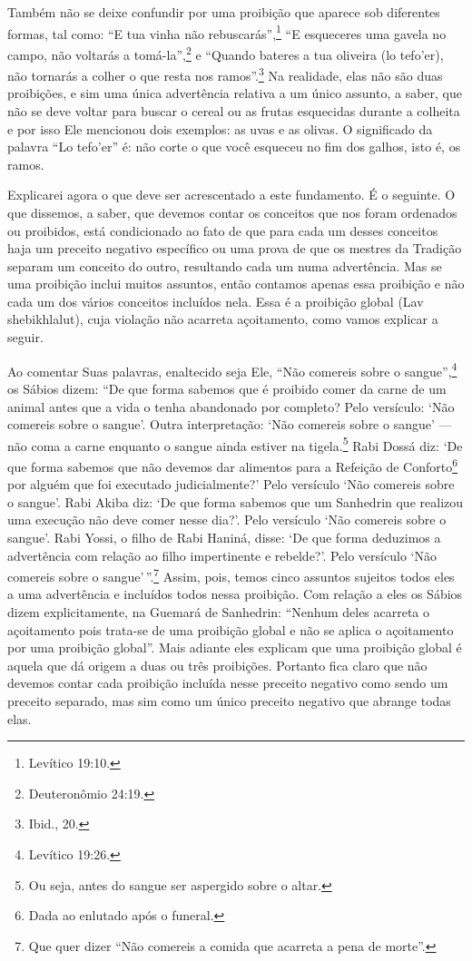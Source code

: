 Também não se deixe confundir por uma proibição que aparece sob
diferentes formas, tal como: ``E tua vinha não rebuscarás'',\footnote{Levítico
19:10.} ``E esqueceres uma gavela no campo, não voltarás a tomá-la'',\footnote{Deuteronômio 24:19.} e ``Quando bateres a tua oliveira (lo tefo'er),
não tornarás a colher o que resta nos ramos''.\footnote{Ibid., 20.} Na realidade,
elas não são duas proibições, e sim uma única advertência relativa a um
único assunto, a saber, que não se deve voltar para buscar o cereal ou
as frutas esquecidas durante a colheita e por isso Ele mencionou dois
exemplos: as uvas e as olivas. O significado da palavra ``Lo tefo'er''
é: não corte o que você esqueceu no fim dos galhos, isto é, os ramos.

Explicarei agora o que deve ser acrescentado a este fundamento. É o
seguinte. O que dissemos, a saber, que devemos contar os conceitos que
nos foram ordenados ou proibidos, está condicionado ao fato de que para
cada um desses conceitos haja um preceito negativo específico ou uma
prova de que os mestres da Tradição separam um conceito do outro,
resultando cada um numa advertência. Mas se uma proibição inclui muitos
assuntos, então contamos apenas essa proibição e não cada um dos vários
conceitos incluídos nela. Essa é a proibição global (Lav shebikhlalut),
cuja violação não acarreta açoitamento, como vamos explicar a seguir.

Ao comentar Suas palavras, enaltecido seja Ele, ``Não comereis sobre o
sangue'',\footnote{Levítico 19:26.} os Sábios dizem: ``De que forma sabemos que é
proibido comer da carne de um animal antes que a vida o tenha abandonado
por completo? Pelo versículo: `Não comereis sobre o sangue'. Outra
interpretação: `Não comereis sobre o sangue' --- não coma a carne
enquanto o sangue ainda estiver na tigela.\footnote{Ou seja, antes do sangue ser aspergido sobre o altar.} Rabi
Dossá diz: `De que forma sabemos que não devemos dar alimentos para a
Refeição de Conforto\footnote{Dada ao enlutado após o funeral.} por alguém que foi executado
judicialmente?' Pelo versículo `Não comereis sobre o sangue'. Rabi Akiba
diz: `De que forma sabemos que um Sanhedrin que realizou uma execução
não deve comer nesse dia?'. Pelo versículo `Não comereis sobre o
sangue'. Rabi Yossi, o filho de Rabi Haniná, disse: `De que forma
deduzimos a advertência com relação ao filho impertinente e rebelde?'.
Pelo versículo `Não comereis sobre o sangue'\,''.\footnote{Que quer dizer ``Não comereis a comida que acarreta a pena de
  morte''.}
Assim, pois, temos cinco assuntos sujeitos todos eles a uma advertência
e incluídos todos nessa proibição. Com relação a eles os Sábios dizem
explicitamente, na Guemará de Sanhedrin: ``Nenhum deles acarreta o
açoitamento pois trata-se de uma proibição global e não se aplica o
açoitamento por uma proibição global''. Mais adiante eles explicam que
uma proibição global é aquela que dá origem a duas ou três proibições.
Portanto fica claro que não devemos contar cada proibição incluída
nesse preceito negativo como sendo um preceito separado, mas sim como um
único preceito negativo que abrange todas elas.


